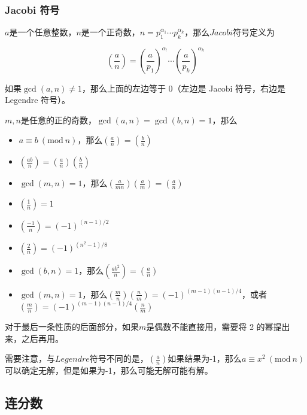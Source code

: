 \documentclass{article}
\begin{document}
\subsubsection{Jacobi 符号}

$a$是一个任意整数，$n$是一个正奇数，$n=p_1^{\alpha_1}\cdots p_k^{\alpha_k}$，那么$Jacobi$符号定义为

\begin{equation}
    \left(\frac{a}{n}\right)=\left(\frac{a}{p_1}\right)^{\alpha_!}\cdots \left(\frac{a}{p_k}\right)^{\alpha_k}
    \nonumber
\end{equation}

如果$\gcd(a,n)\neq 1$，那么上面的左边等于 0（左边是 Jacobi 符号，右边是 Legendre 符号）。

$m,n$是任意的正的奇数，$\gcd(a,n)=\gcd(b,n)=1$，那么

\begin{itemize}
    \item $a\equiv b~(\mathrm{mod}~n)$，那么$\displaystyle \left(\frac{a}{n}\right)=\left(\frac{b}{n}\right)$
    \item $\displaystyle \left(\frac{ab}{n}\right)=\left(\frac{a}{n}\right)\left(\frac{b}{n}\right)$
    \item $\gcd(m,n)=1$，那么$\displaystyle \left(\frac{a}{mn}\right)\left(\frac{a}{m}\right)=\left(\frac{a}{n}\right)$
    \item $\displaystyle \left(\frac{1}{n}\right)=1$
    \item $\displaystyle \left(\frac{-1}{n}\right)=(-1)^{(n-1)/2}$
    \item $\displaystyle \left(\frac{2}{n}\right)=(-1)^{(n^2-1)/8}$
    \item $\gcd(b,n)=1$，那么$\displaystyle \left(\frac{ab^2}{n}\right)=\left(\frac{a}{n}\right)$
    \item $\gcd(m,n)=1$，那么$\displaystyle \left(\frac{m}{n}\right)\left(\frac{n}{m}\right)=(-1)^{(m-1)(n-1)/4}$，或者 $\displaystyle \left(\frac{m}{n}\right)=(-1)^{(m-1)(n-1)/4}\left(\frac{n}{m}\right)$
\end{itemize}

对于最后一条性质的后面部分，如果$m$是偶数不能直接用，需要将 2 的幂提出来，之后再用。

需要注意，与$Legendre$符号不同的是，$\displaystyle \left(\frac{a}{n}\right)$如果结果为-1，那么$a\equiv x^2~(\mathrm{mod}~n)$可以确定无解，但是如果为-1，那么可能无解可能有解。

\subsection{连分数}
\end{document}
